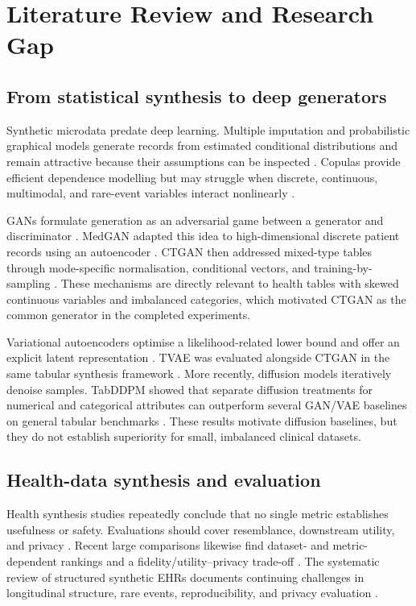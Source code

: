 \chapter{Literature Review and Research Gap}
\label{chap:literature}

\section{From statistical synthesis to deep generators}

Synthetic microdata predate deep learning. Multiple imputation and probabilistic graphical models generate records from estimated conditional distributions and remain attractive because their assumptions can be inspected \citep{raghunathan2003}. Copulas provide efficient dependence modelling but may struggle when discrete, continuous, multimodal, and rare-event variables interact nonlinearly \citep{wang2021}.

GANs formulate generation as an adversarial game between a generator and discriminator \citep{goodfellow2014}. MedGAN adapted this idea to high-dimensional discrete patient records using an autoencoder \citep{choi2017}. CTGAN then addressed mixed-type tables through mode-specific normalisation, conditional vectors, and training-by-sampling \citep{xu2019}. These mechanisms are directly relevant to health tables with skewed continuous variables and imbalanced categories, which motivated CTGAN as the common generator in the completed experiments.

Variational autoencoders optimise a likelihood-related lower bound and offer an explicit latent representation \citep{kingma2014}. TVAE was evaluated alongside CTGAN in the same tabular synthesis framework \citep{xu2019}. More recently, diffusion models iteratively denoise samples. TabDDPM showed that separate diffusion treatments for numerical and categorical attributes can outperform several GAN/VAE baselines on general tabular benchmarks \citep{kotelnikov2023}. These results motivate diffusion baselines, but they do not establish superiority for small, imbalanced clinical datasets.

\section{Health-data synthesis and evaluation}

Health synthesis studies repeatedly conclude that no single metric establishes usefulness or safety. Evaluations should cover resemblance, downstream utility, and privacy \citep{goncalves2020,hernandez2023,pezoulas2024}. Recent large comparisons likewise find dataset- and metric-dependent rankings and a fidelity/utility--privacy trade-off \citep{hernandez2025,nanevski2026}. The systematic review of structured synthetic EHRs documents continuing challenges in longitudinal structure, rare events, reproducibility, and privacy evaluation \citep{ghosheh2024}.

